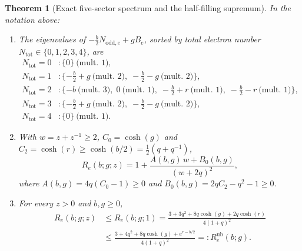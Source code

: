 \documentclass[11pt]{article}
\theoremstyle{plain}
\newtheorem{theorem}{Theorem}
\theoremstyle{definition}
\newcommand{\NoddE}{N_{\mathrm{odd},e}}
\begin{document}
\begin{theorem}[Exact five-sector spectrum and the half-filling
supremum]\label{thm:bond}
In the notation above:
\begin{enumerate}
\item\label{it:spec} The eigenvalues of $-\tfrac{b}{2}\NoddE+gB_e$, sorted by
total electron number $N_{\mathrm{tot}}\in\{0,1,2,3,4\}$, are
\[
\begin{aligned}
N_{\mathrm{tot}}=0 &: \{0\}\ \text{(mult.\ 1)},\\
N_{\mathrm{tot}}=1 &: \{-\tfrac{b}{2}+g\ \text{(mult.\ 2)},\;
-\tfrac{b}{2}-g\ \text{(mult.\ 2)}\},\\
N_{\mathrm{tot}}=2 &: \{-b\ \text{(mult.\ 3)},\; 0\ \text{(mult.\ 1)},\;
-\tfrac{b}{2}+r\ \text{(mult.\ 1)},\; -\tfrac{b}{2}-r\ \text{(mult.\ 1)}\},\\
N_{\mathrm{tot}}=3 &: \{-\tfrac{b}{2}+g\ \text{(mult.\ 2)},\;
-\tfrac{b}{2}-g\ \text{(mult.\ 2)}\},\\
N_{\mathrm{tot}}=4 &: \{0\}\ \text{(mult.\ 1)}.
\end{aligned}
\]
\item\label{it:closed} With $w=z+z^{-1}\ge2$, $C_0=\cosh(g)$ and
$C_2=\cosh(r)\ge\cosh(b/2)=\tfrac12(q+q^{-1})$,
\begin{equation}\label{eq:closed}
R_e(b;g;z)=1+\frac{A(b,g)\,w+B_0(b,g)}{(w+2q)^{2}},
\end{equation}
where $A(b,g)=4q(C_0-1)\ge0$ and $B_0(b,g)=2qC_2-q^{2}-1\ge0$.
\item\label{it:sup} For every $z>0$ and $b,g\ge0$,
\begin{equation}\label{eq:sup}
\begin{aligned}
R_e(b;g;z)&\le R_e(b;g;1)
=\frac{3+3q^{2}+8q\cosh(g)+2q\cosh(r)}{4(1+q)^{2}}\\
&\le\frac{3+4q^{2}+8q\cosh(g)+e^{r-b/2}}{4(1+q)^{2}}
=:R_e^{\mathrm{ub}}(b;g).
\end{aligned}
\end{equation}
\end{enumerate}
\end{theorem}
\end{document}
